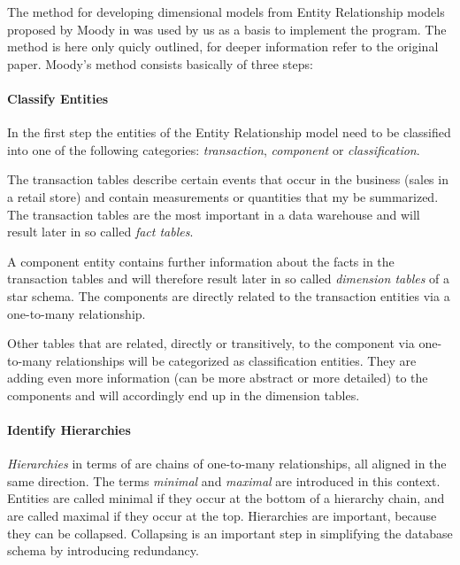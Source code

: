 
The method for developing dimensional models from Entity Relationship models proposed by Moody \andothers in \cite{moody2000enterprise} was used by us as a basis to implement the program.
The method is here only quicly outlined, for deeper information refer to the original paper.
Moody's method consists basically of three steps:

\paragraph{Classify Entities}

In the first step the entities of the Entity Relationship model need to be classified into one of the following categories: \emph{transaction}, \emph{component} or \emph{classification}.

The transaction tables describe certain events that occur in the business (\eg sales in a retail store) and contain measurements or quantities that my be summarized.
The transaction tables are the most important in a data warehouse and will result later in so called \emph{fact tables}.

A component entity contains further information about the facts in the transaction tables and will therefore result later in so called \emph{dimension tables} of a star schema.
The components are directly related to the transaction entities via a one-to-many relationship.

Other tables that are related, directly or transitively, to the component via one-to-many relationships will be categorized as classification entities.
They are adding even more information (can be more abstract or more detailed) to the components and will accordingly end up in the dimension tables.

\paragraph{Identify Hierarchies}

\emph{Hierarchies} in terms of \cite{moody2000enterprise} are chains of one-to-many relationships, all aligned in the same direction.
The terms \emph{minimal} and \emph{maximal} are introduced in this context.
Entities are called minimal if they occur at the bottom of a hierarchy chain, and are called maximal if they occur at the top.
Hierarchies are important, because they can be collapsed.
Collapsing is an important step in simplifying the database schema by introducing redundancy.

